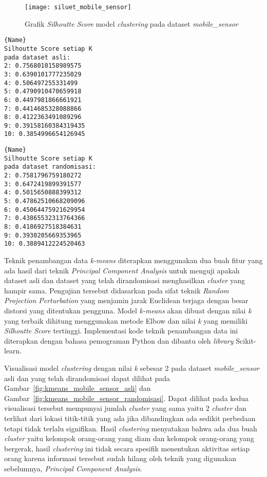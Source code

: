 \begin{figure}
	\centering
	\texttt{[image: siluet\_mobile\_sensor]}
	\caption{Grafik \textit{Silhoutte Score} model \textit{clustering} pada dataset \textit{mobile\_sensor}}
	\label{fig:siluet_mobile_sensor}
\end{figure}
	
\noindent\begin{minipage}{.46\textwidth}
\begin{lstlisting}[caption=Silhoutte Score Asli,frame=tlrb, label=mobile_sensor_siluet_asli]{Name}
Silhoutte Score setiap K
pada dataset asli: 
2: 0.7568010158989575
3: 0.6390101777235029
4: 0.506497255331499
5: 0.4790910470659918
6: 0.4497981866661921
7: 0.4414685328088866
8: 0.4122363491089296
9: 0.39158160384319435
10: 0.3854996654126945
\end{lstlisting}
\end{minipage}\hfill
\begin{minipage}{.46\textwidth}
\begin{lstlisting}[caption=Silhoutte Score Randomisasi,frame=tlrb, label=mobile_sensor_siluet_randomisasi]{Name}
Silhoutte Score setiap K
pada dataset randomisasi: 
2: 0.7581796759180272
3: 0.6472419899391577
4: 0.5015650888399312
5: 0.47862510668209096
6: 0.45064475921629954
7: 0.43865532313764366
8: 0.4186927518384631
9: 0.3930205669353965
10: 0.3889412224520463
\end{lstlisting}
\end{minipage}

Teknik penambangan data \textit{k-means} diterapkan menggunakan dua buah fitur yang ada hasil dari teknik \textit{Principal Component Analysis} untuk menguji apakah dataset asli dan dataset yang telah dirandomisasi menghasilkan \textit{cluster} yang hampir sama. Pengujian tersebut didasarkan pada sifat teknik \textit{Random Projection Perturbation} yang menjamin jarak Euclidean terjaga dengan besar distorsi yang ditentukan pengguna. Model \textit{k-means} akan dibuat dengan nilai \textit{k} yang terbaik dihitung menggunakan metode Elbow dan nilai \textit{k} yang memiliki \textit{Silhoutte Score} tertinggi. Implementasi kode teknik penambangan data ini diterapkan dengan bahasa pemograman Python dan dibantu oleh \textit{library} Scikit-learn. 

Visualisasi model \textit{clustering} dengan nilai \textit{k} sebesar 2 pada dataset \textit{mobile\_sensor} asli dan yang telah dirandomisasi dapat dilihat pada Gambar~\ref{fig:kmeans_mobile_sensor_asli} dan Gambar~\ref{fig:kmeans_mobile_sensor_randomisasi}. Dapat dilihat pada kedua visualisasi tersebut mempunyai jumlah \textit{cluster} yang sama yaitu 2 \textit{cluster} dan terlihat dari lokasi titik-titik yang ada jika dibandingkan ada sedikit perbedaan tetapi tidak terlalu signifikan. Hasil \textit{clustering} menyatakan bahwa ada dua buah \textit{cluster} yaitu kelompok orang-orang yang diam dan kelompok orang-orang yang bergerak, hasil \textit{clustering} ini tidak secara spesifik menentukan aktivitas setiap orang karena informasi tersebut sudah hilang oleh teknik yang digunakan sebelumnya, \textit{Principal Component Analysis}. 
	
